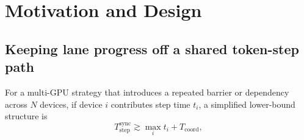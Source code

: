 \section{Motivation and Design}
\subsection{Keeping lane progress off a shared token-step path}
For a multi-GPU strategy that introduces a repeated barrier or dependency across $N$ devices, if device $i$ contributes step time $t_i$, a simplified lower-bound structure is
\begin{equation}
T_{\mathrm{step}}^{\mathrm{sync}} \gtrsim \max_i t_i + T_{\mathrm{coord}},
\label{eq:sync}
\end{equation}
